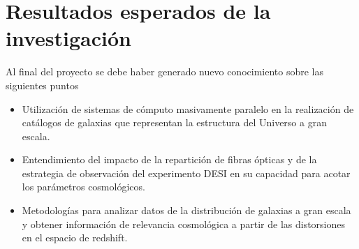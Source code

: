 
\section{Resultados esperados de la investigaci\'on}

Al final del proyecto se debe haber generado nuevo conocimiento sobre
las siguientes puntos 
 
\begin{itemize}
\item Utilizaci\'on de sistemas de c\'omputo masivamente paralelo en la
  realizaci\'on de cat\'alogos de galaxias que representan la
  estructura del Universo a gran escala.  
\item Entendimiento del impacto de la repartici\'on de fibras
  \'opticas y de la estrategia de observaci\'on del experimento DESI
  en su capacidad para acotar los par\'ametros cosmol\'ogicos.
\item Metodolog\'ias para analizar datos de la distribuci\'on de
  galaxias a gran escala y obtener informaci\'on de relevancia
  cosmol\'ogica a partir de las distorsiones en el espacio de
  redshift.
\end{itemize}

